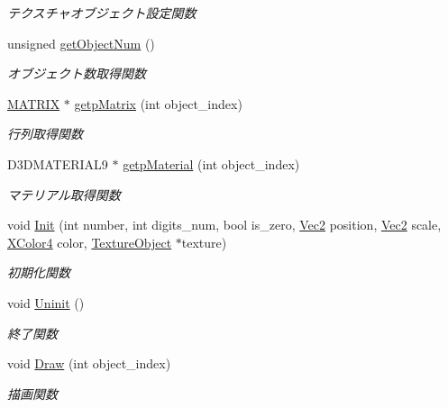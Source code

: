 \begin{DoxyCompactItemize}
\begin{DoxyCompactList}\small\item\em テクスチャオブジェクト設定関数 \end{DoxyCompactList}\item 
unsigned \mbox{\hyperlink{class_numbers_polygon_ac60854b764b6b386d7a2c2b5f927f233}{get\+Object\+Num}} ()
\begin{DoxyCompactList}\small\item\em オブジェクト数取得関数 \end{DoxyCompactList}\item 
\mbox{\hyperlink{_matrix_8h_a032295cd9fb1b711757c90667278e744}{M\+A\+T\+R\+IX}} $\ast$ \mbox{\hyperlink{class_numbers_polygon_a733cb6576e892e006c300b5c9aaeef76}{getp\+Matrix}} (int object\+\_\+index)
\begin{DoxyCompactList}\small\item\em 行列取得関数 \end{DoxyCompactList}\item 
D3\+D\+M\+A\+T\+E\+R\+I\+A\+L9 $\ast$ \mbox{\hyperlink{class_numbers_polygon_a73430535eec0f86d3502b45405ed8dc0}{getp\+Material}} (int object\+\_\+index)
\begin{DoxyCompactList}\small\item\em マテリアル取得関数 \end{DoxyCompactList}\item 
void \mbox{\hyperlink{class_numbers_polygon_acb7dad87d99bd796323ccf251fc96384}{Init}} (int number, int digits\+\_\+num, bool is\+\_\+zero, \mbox{\hyperlink{_vector3_d_8h_a5ef6e95dfc5f9d3820b71772d99bbc25}{Vec2}} position, \mbox{\hyperlink{_vector3_d_8h_a5ef6e95dfc5f9d3820b71772d99bbc25}{Vec2}} scale, \mbox{\hyperlink{_vector3_d_8h_a680c30c4a07d86fe763c7e01169cd6cc}{X\+Color4}} color, \mbox{\hyperlink{class_texture_object}{Texture\+Object}} $\ast$texture)
\begin{DoxyCompactList}\small\item\em 初期化関数 \end{DoxyCompactList}\item 
void \mbox{\hyperlink{class_numbers_polygon_a0e5a9af5b25704ba21b80e235d913f86}{Uninit}} ()
\begin{DoxyCompactList}\small\item\em 終了関数 \end{DoxyCompactList}\item 
void \mbox{\hyperlink{class_numbers_polygon_a38ee9290de377abc33515f870d5488c5}{Draw}} (int object\+\_\+index)
\begin{DoxyCompactList}\small\item\em 描画関数 \end{DoxyCompactList}\end{DoxyCompactItemize}
